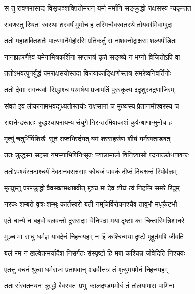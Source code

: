 \twolineshloka
{स तु रावणमासाद्य विसृजञ्शक्तितोमरान्}
{यमो मर्माणि सङ्क्रुद्धो राक्षसस्य न्यकृन्तत} %

\twolineshloka
{रावणस्तु स्थितः स्वस्थः शरवर्षं मुमोच ह}
{तस्मिन्वैवस्वतरथे तोयवर्षमिवाम्बुदः} %

\twolineshloka
{ततो महाशक्तिशतैः पात्यमानैर्महोरसि}
{प्रतिकर्तुं स नाशक्नोद्राक्षसः शल्यपीडितः} %

\twolineshloka
{नानाप्रहरणैरेवं यमेनामित्रकर्शिना}
{सप्तरात्रं कृते सङ्ख्ये न भग्नो विजितोऽपि वा} %

\twolineshloka
{ततोऽभवत्पुनर्युद्धं यमराक्षसयोस्तदा}
{विजयाकाङ्क्षिणोस्तत्र समरेष्वनिवर्तिनोः} %

\twolineshloka
{ततो देवाः सगन्धर्वाः सिद्धाश्च परमर्षयः}
{प्रजापतिं पुरस्कृत्य ददृशुस्तद्रणाजिरम्} %

\twolineshloka
{संवर्त इव लोकानामभवद्युध्यतोस्तयोः}
{राक्षसानां च मुख्यस्य प्रेतानामीश्वरस्य च} %

\twolineshloka
{राक्षसेन्द्रस्ततः क्रुद्धश्चापमायम्य संयुगे}
{निरन्तरमिवाकाशं कुर्वन्बाणान्मुमोच ह} %

\twolineshloka
{मृत्युं चतुर्भिर्विशिखैः सूतं सप्तभिरर्दयत्}
{यमं शरसहस्रेण शीघ्रं मर्मस्वताडयत्} %

\twolineshloka
{ततः क्रुद्धस्य सहसा यमस्याभिविनिःसृतः}
{ज्वालामालो विनिश्वासो वदनात्क्रोधपावकः} %

\twolineshloka
{ततोऽपश्यंस्तदाश्चर्यं देवदानवराक्षसाः}
{क्रोधजं पावकं दीप्तं दिधक्षन्तं रिपोर्बलम्} %

\twolineshloka
{मृत्युस्तु परमक्रुद्धो वैवस्वतमथाब्रवीत्}
{मुञ्च मां देव शीघ्रं त्वं निहन्मि समरे रिपुम्} %

\twolineshloka
{नरकः शम्बरो वृत्रः शम्भुः कार्तस्वरो बली}
{नमुचिर्विरोचनश्चैव तावुभौ मधुकैटभौ} %

\twolineshloka
{एते चान्ये च बहवो बलवन्तो दुरासदाः}
{विनिपन्ना मया दृष्टाः का चिन्तास्मिन्निशाचरे} %

\twolineshloka
{मुञ्च मां साधु धर्मज्ञ यावदेनं निहन्म्यहम्}
{न हि कश्चिन्मया दृष्टो मुहूर्तमपि जीवति} %

\twolineshloka
{बलं मम न खल्वेतन्मर्यादैषा निसर्गतः}
{संस्पृष्टो हि मया कश्चिन्न जीवेदिति निश्चयः} %

\twolineshloka
{एतत्तु वचनं श्रुत्वा धर्मराजः प्रतापवान्}
{अब्रवीत्तत्र तं मृत्युमयमेनं निहन्म्यहम्} %

\twolineshloka
{ततः संरक्तनयनः क्रुद्धो वैवस्वतः प्रभुः}
{कालदण्डममोघं तं तोलयामास पाणिना} %

